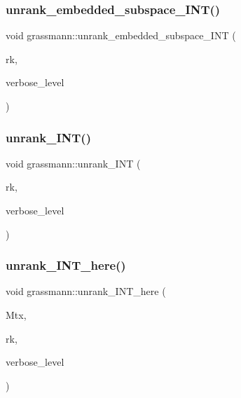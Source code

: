 \subsubsection{\texorpdfstring{unrank\+\_\+embedded\+\_\+subspace\+\_\+\+I\+N\+T()}{unrank\_embedded\_subspace\_INT()}}
{\footnotesize\ttfamily void grassmann\+::unrank\+\_\+embedded\+\_\+subspace\+\_\+\+I\+NT (\begin{DoxyParamCaption}\item[{\mbox{\hyperlink{galois_8h_a09fddde158a3a20bd2dcadb609de11dc}{I\+NT}}}]{rk,  }\item[{\mbox{\hyperlink{galois_8h_a09fddde158a3a20bd2dcadb609de11dc}{I\+NT}}}]{verbose\+\_\+level }\end{DoxyParamCaption})}

\mbox{\label{classgrassmann_a32079405b95a6da2ba1420567d762d64}} 
\subsubsection{\texorpdfstring{unrank\+\_\+\+I\+N\+T()}{unrank\_INT()}}
{\footnotesize\ttfamily void grassmann\+::unrank\+\_\+\+I\+NT (\begin{DoxyParamCaption}\item[{\mbox{\hyperlink{galois_8h_a09fddde158a3a20bd2dcadb609de11dc}{I\+NT}}}]{rk,  }\item[{\mbox{\hyperlink{galois_8h_a09fddde158a3a20bd2dcadb609de11dc}{I\+NT}}}]{verbose\+\_\+level }\end{DoxyParamCaption})}

\mbox{\label{classgrassmann_aa51bb30ed0feb7ad87d500b76e0b3cbe}} 
\subsubsection{\texorpdfstring{unrank\+\_\+\+I\+N\+T\+\_\+here()}{unrank\_INT\_here()}}
{\footnotesize\ttfamily void grassmann\+::unrank\+\_\+\+I\+N\+T\+\_\+here (\begin{DoxyParamCaption}\item[{\mbox{\hyperlink{galois_8h_a09fddde158a3a20bd2dcadb609de11dc}{I\+NT}} $\ast$}]{Mtx,  }\item[{\mbox{\hyperlink{galois_8h_a09fddde158a3a20bd2dcadb609de11dc}{I\+NT}}}]{rk,  }\item[{\mbox{\hyperlink{galois_8h_a09fddde158a3a20bd2dcadb609de11dc}{I\+NT}}}]{verbose\+\_\+level }\end{DoxyParamCaption})}

